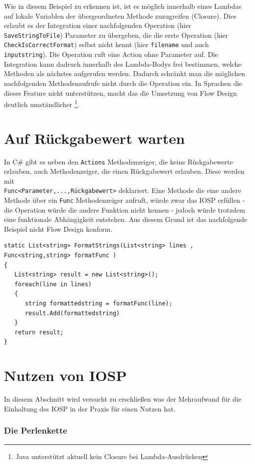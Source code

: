 Wie in diesem Beispiel zu erkennen ist, ist es möglich innerhalb eines
Lambdas auf lokale Variablen der übergeordneten Methode zuzugreifen (Closure). Dies erlaubt es der Integration einer nachfolgenden Operation (hier \texttt{SaveStringToFile}) Parameter zu übergeben,
die die erste Operation (hier \texttt{CheckIsCorrectFormat}) selbst nicht kennt (hier
\texttt{filename} und auch \texttt{inputstring}). Die Operation ruft eine Action ohne
Parameter auf. Die Integration kann dadruch innerhalb des Lambda-Bodys frei
bestimmen, welche Methoden als nächstes aufgerufen werden.
Dadurch schränkt man die möglichen nachfolgenden Methodenaufrufe nicht durch
die Operation ein. In Sprachen die dieses Feature
nicht unterstützen, macht das die Umsetzung von Flow Design deutlich umständlicher
\footnote{Java unterstützt aktuell kein Closure bei Lambda-Ausdrücken}.

\section{Auf Rückgabewert warten}

In C\# gibt es neben den \texttt{Actions} Methodenzeiger, die keine Rückgabewerte 
erlauben, auch Methodenzeiger, die einen Rückgabewert erlauben.
Diese werden mit\\\texttt{Func<Parameter,...,Rückgabewert>} deklariert.
Eine Methode die eine andere Methode über ein \texttt{Func} Methodenzeiger aufruft,
würde zwar das IOSP erfüllen - die Operation würde die andere Funktion nicht
kennen - jedoch würde trotzdem eine funktionale Abhängigkeit entstehen.
Aus diesem Grund ist das nachfolgende Beispiel nicht Flow Design konform.

\begin{lstlisting}[caption=Auf Rückgabewert warten]
static List<string> FormatStrings(List<string> lines , Func<string,string> formatFunc )
{
   List<string> result = new List<string>();
   foreach(line in lines)
   {
      string formattedstring = formatFunc(line);
      result.Add(formattedstring)
   }
   return result;
}
\end{lstlisting}


\section{Nutzen von IOSP}

In diesem Abschnitt wird versucht zu erschließen was der Mehraufwand für die
Einhaltung des IOSP in der Praxis für einen Nutzen hat.
\subsubsection{Die Perlenkette}

